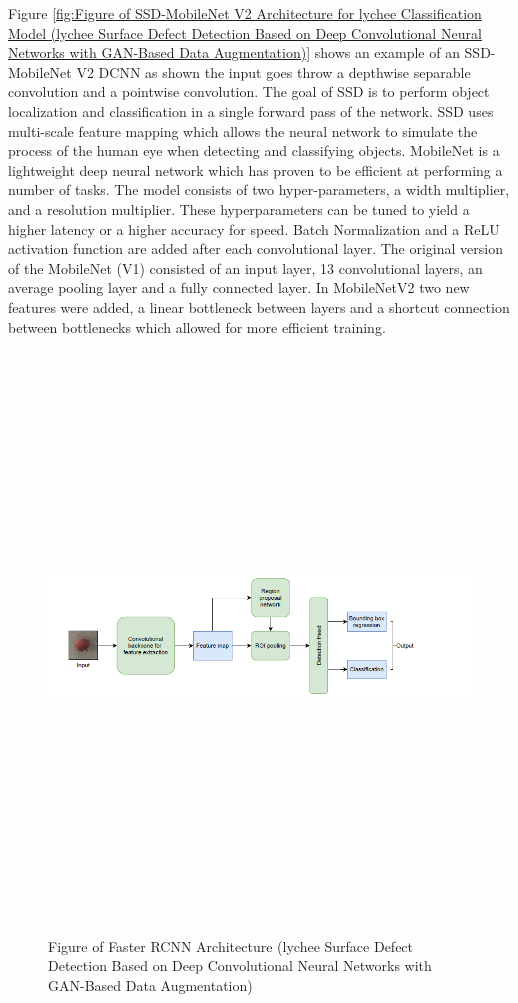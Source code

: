 Figure \ref{fig:Figure of SSD-MobileNet V2 Architecture for lychee Classification Model (lychee Surface Defect Detection Based on Deep Convolutional Neural Networks with GAN-Based Data Augmentation)} shows an example of an SSD-MobileNet V2 DCNN as shown the input goes throw a depthwise separable convolution and a pointwise convolution.  The goal of SSD is to perform object localization and classification in a single forward pass of the network.  SSD uses multi-scale feature mapping which allows the neural network to simulate the process of the human eye when detecting and classifying objects.  MobileNet is a lightweight deep neural network which has proven to be efficient at performing a number of tasks.  The model consists of two hyper-parameters, a width multiplier, and a resolution multiplier. These hyperparameters can be tuned to yield a higher latency or a higher accuracy for speed.  Batch Normalization and a ReLU activation function are added after each convolutional layer.  The original version of the MobileNet (V1) consisted of an input layer, 13 convolutional layers, an average pooling layer and a fully connected layer\cite{litReviewLychee}.  In MobileNetV2 two new features were added, a linear bottleneck between layers and a shortcut connection between bottlenecks which allowed for more efficient training.  
 \begin{figure}[H]
    \centering
    \includegraphics[width=1\textwidth,height=15cm,keepaspectratio]{Images/FasterRCNN.PNG}\\
    \caption{Figure of Faster RCNN Architecture (lychee Surface Defect Detection Based on Deep Convolutional Neural Networks with GAN-Based Data Augmentation)\cite{litReviewLychee}}
    \label{fig:Figure of Faster RCNN Architecture for lychee Classification Model (lychee Surface Defect Detection Based on Deep Convolutional Neural Networks with GAN-Based Data Augmentation) }
\end{figure}
